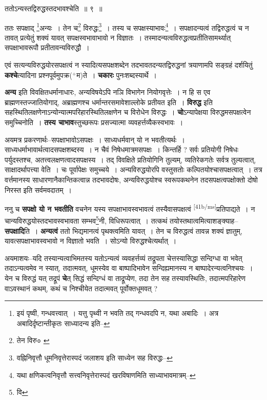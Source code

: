 \documentclass[article,12pt,a4paper]{memoir}
\newcommand{\add}[1]{($^{+}$#1)}
\begin{document}
	  \pstart ततोऽन्यस्तद्विरुद्धस्तदभावश्चेति ॥ ९ ॥
	\pend
       

	  \pstart ततः सपक्षाद् \footnote{इयं पृष्वी, गन्धवत्त्वात् । यत्तु पृथ्वी न भवति तद् गन्धवदपि न, यथा अबादिः । अत्र अबादिर्दृष्टान्तीकृतः साध्यादन्य इति--\cite{dp-msD-n}}अन्यः । तेन च\footnote{तेन विरु० \cite{dp-msB}} विरुद्धः\footnote{वह्निनिवृत्तौ धूमनिवृत्तेरास्पदं जलाशय इति साध्येन सह विरुद्धः--\cite{dp-msD-n}} । तस्य च सपक्षस्याभावः\footnote{यथा क्षणिकत्वनिवृत्तौ सत्त्वनिवृत्तेरास्पदं खरविषाणमिति साध्याभावमात्रम्--\cite{dp-msD-n}} । सपक्षादन्यत्वं तद्विरुद्धत्वं च न तावत् प्रत्येतुं शक्यं यावत् सपक्षस्वभावाभावो न विज्ञातः । तस्मादन्यत्वविरुद्धत्वप्रतीतिसामर्थ्यात् सपक्षाभावरूपौ प्रतीतावन्यविरुद्धौ ।
	\pend
      

	  \pstart एवं सत्यन्यविरुद्धयोरसपक्षत्वं न स्यादित्यसपक्षशब्देन तदभावतदन्यतद्विरुद्धनां त्रयाणामपि सङ्ग्रहं दर्शयितुं \textbf{कश्चे}त्यादिना प्रश्नपूर्वमुपक्र\add{म}ते । \textbf{चकारः} पुनःशब्दस्यार्थे ।
	\pend
      

	  \pstart \textbf{अन्य} इति विवक्षितधर्मानाधारः, अन्यविषयेऽपि नञि विभागेन नियोगवृत्तेः । न हि स एव ब्राह्मणस्तज्जातियोगाद्, अब्राह्मणश्च धर्मान्तरसमावेशाल्लोके प्रतीयत इति । \textbf{विरुद्ध} इति सहस्थितिलक्षणेनाऽन्योन्यात्मपरिहारस्थितिलक्षणेन च विरोधेन विरुद्धः । \textbf{चो}ऽन्यापेक्षया विरुद्धमसपक्षत्वेन समुच्चिनोति । \textbf{तस्य चाभाव}स्तुच्छरूपः प्रसज्यात्मा व्यवहर्त्तव्यैकस्वभावः ।
	\pend
      

	  \pstart अयमत्र प्रकरणार्थः--सपक्षाभावोऽसपक्षः । साध्यधर्मवान् यो न भवतीत्यर्थः । साध्यधर्माभावार्थत्वादसपक्षशब्दस्य । न चैवं निषेधमात्रमसपक्षः । किन्तर्हि ? सर्वः प्रतियोगी निषेधः पर्युदस्तश्च, अतत्त्वलक्षणत्वादसपक्षस्य । तद् विवक्षिते प्रतियोगिनि तुल्यम्, व्यतिरेकगतेः सर्वत्र तुल्यत्वात्, साक्षादर्थापत्त्या वेति । चः पूर्वापेक्षः समुच्चये । अन्यविरुद्धयोरपि वस्तुसतोः कल्पितयोश्चासपक्षत्वात् । तत्र वर्त्तमानस्य साधारणानैकान्तिकत्वान्न तदभावदोषः, अन्यविरुद्धयोश्च स्वरूपकथनेन तदसपक्षत्वपक्षोक्तो दोषो निरस्त इति सर्वमवदातम् ।
	\pend
      

	  \pstart ननु च \textbf{सपक्षो यो न भवतीति} वचनेन यस्य सपक्षाभावस्वभावत्वं तस्यैवासपक्षत्वं \leavevmode\textsuperscript{\rmlatinfont\tiny [41b/ms]}प्रतिपाद्यते । न चान्यविरुद्धयोस्तदभावस्वभावता सम्भव\footnote{वि}नी, विधिरूपत्वात् । तत्कथं तयोस्तथात्वमित्याशङ्क्याह--\textbf{सपक्षादि}ति । \textbf{अन्यत्वं} ततो भिद्यमानत्वं पृथक्त्वमिति यावत् । तेन च विरुद्धत्वं तावन्न शक्यं ज्ञातुम्, यावत्सपक्षाभावस्वभावो न विज्ञातो भवति । सोऽन्यो विरुद्धश्चेत्यर्थात् ।
	\pend
      

	  \pstart अयमाशयः--यदि तस्यान्यत्वाभिमतस्य यतोऽन्यत्वं व्यवहर्त्तव्यं तद्रूपता चेत्तस्यासिद्धा सन्दिग्धा वा भवेत् तदाऽन्यत्वमेव न स्यात्, तदात्मवत्, धूमस्येव वा बाष्पादिभावेन सन्दिह्यमानस्य न बाष्पादेरन्यत्वनिश्चयः । येन च विरुद्धं यत् तद्रूपं \textbf{चे}त् सिद्धं सन्दिग्धं वा ताद्रूप्येण, तदा तेन सह तस्यावस्थितिः, तदात्मपरिहारेण वाऽवस्थानं कथम्, कथं च निश्चीयेत तदात्मवत् पूर्वोक्तधूमवत् ?
	\pend
      
\end{document}
